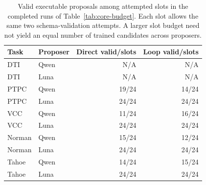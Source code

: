 \begin{table}[htbp]
\centering\small
\setlength{\tabcolsep}{4pt}
\begin{tabularx}{\linewidth}{@{}lXrr@{}}
\toprule
Task & Proposer & Direct valid/slots & Loop valid/slots \\
\midrule
DTI & Qwen & N/A & N/A \\
DTI & Luna & N/A & N/A \\
PTPC & Qwen & 19/24 & 14/24 \\
PTPC & Luna & 24/24 & 24/24 \\
VCC & Qwen & 11/24 & 16/24 \\
VCC & Luna & 24/24 & 24/24 \\
Norman & Qwen & 15/24 & 12/24 \\
Norman & Luna & 24/24 & 24/24 \\
Tahoe & Qwen & 14/24 & 15/24 \\
Tahoe & Luna & 24/24 & 24/24 \\
\bottomrule
\end{tabularx}
\caption{Valid executable proposals among attempted slots in the completed runs of Table~\ref{tab:core-budget}. Each slot allows the same two schema-validation attempts. A larger slot budget need not yield an equal number of trained candidates across proposers.}
\label{tab:core-validity}
\end{table}
